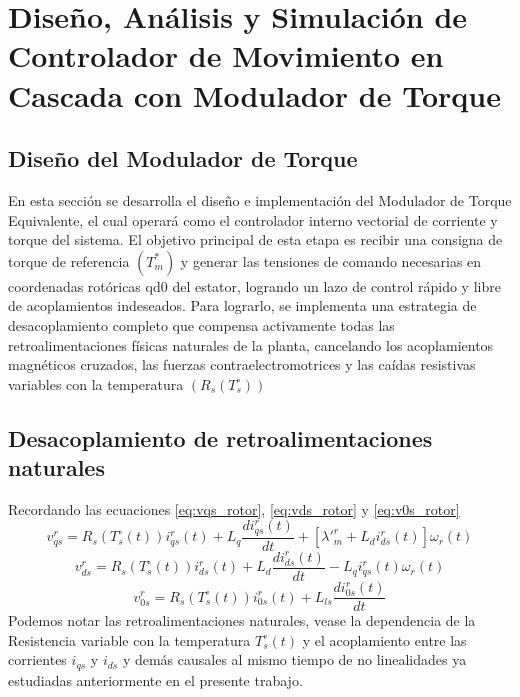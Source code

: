 \documentclass[12pt, a4paper,journal, onecolumn, compsoc]{IEEEtran}
\begin{document}


\section{Diseño, Análisis y Simulación de Controlador de Movimiento en Cascada con Modulador de Torque}
\subsection{Diseño del Modulador de Torque}

En esta sección se desarrolla el diseño e implementación del Modulador de Torque Equivalente, el cual operará como el controlador interno vectorial de corriente y torque del sistema. El objetivo principal de esta etapa es recibir una consigna de torque de referencia $(T_m^*)$ y generar las tensiones de comando necesarias en coordenadas rotóricas qd0 del estator, logrando un lazo de control rápido y libre de acoplamientos indeseados. Para lograrlo, se implementa una estrategia de desacoplamiento completo que compensa activamente todas las retroalimentaciones físicas naturales de la planta, cancelando los acoplamientos magnéticos cruzados, las fuerzas contraelectromotrices y las caídas resistivas variables con la temperatura $(R_s(T_s^\circ))$
\subsection{Desacoplamiento de retroalimentaciones naturales}
Recordando las ecuaciones \eqref{eq:vqs_rotor}, \eqref{eq:vds_rotor} y \eqref{eq:v0s_rotor}
    \begin{equation*}
        v^r_{qs}=R_s(T_s^\circ(t))i^r_{qs}(t) + L_q\frac{d i^r_{qs}(t)}{dt}+[\lambda'^r_m + L_d i^r_{ds}(t)]\omega_r(t)
    \end{equation*}
    \begin{equation*}
        v_{ds}^r=R_s(T_s^\circ(t))i^r_{ds}(t)+L_d\frac{d i^r_{ds}(t)}{dt} - L_qi^r_{qs}(t)\omega_r(t)
    \end{equation*}
    \begin{equation*}
        v^r_{0s}=R_s(T_s^\circ(t))i^r_{0s}(t)+L_{ls}\frac{d i^r_{0s}(t)}{dt}
    \end{equation*}
Podemos notar las retroalimentaciones naturales, vease la dependencia de la Resistencia variable con la temperatura $T_s^\circ(t)$ y el acoplamiento entre las corrientes $i_{qs}$ y $i_{ds}$ y demás causales al mismo tiempo de no linealidades ya estudiadas anteriormente en el presente trabajo.
\end{document}

